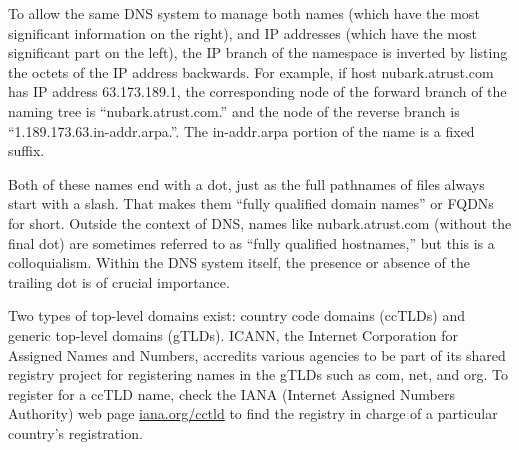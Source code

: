 
\protect\hypertarget{part0024_split_007.htmlux5cux23_idIndexMarker1987}{}{}\protect\hypertarget{part0024_split_007.htmlux5cux23_idIndexMarker1988}{}{}\protect\hypertarget{part0024_split_007.htmlux5cux23_idIndexMarker1989}{}{}\protect\hypertarget{part0024_split_007.htmlux5cux23_idIndexMarker1990}{}{}\protect\hypertarget{part0024_split_007.htmlux5cux23_idIndexMarker1991}{}{}To
allow the same DNS system to manage both names (which have the most
significant information on the right), and IP addresses (which have the
most significant part on the left), the IP branch of the namespace is
inverted by listing the octets of the IP address backwards. For example,
if host nubark.atrust.com has IP address 63.173.189.1, the corresponding
node of the forward branch of the naming tree is ``nubark.atrust.com.''
and the node of the
\protect\hypertarget{part0024_split_007.htmlux5cux23_idIndexMarker1992}{}{}reverse
branch is
``1.189.173.63.\protect\hypertarget{part0024_split_007.htmlux5cux23_idIndexMarker1993}{}{}\protect\hypertarget{part0024_split_007.htmlux5cux23_idIndexMarker1994}{}{}in-addr.arpa.''.
The in-addr.arpa portion of the name is a fixed suffix.

\protect\hypertarget{part0024_split_007.htmlux5cux23_idIndexMarker1995}{}{}\protect\hypertarget{part0024_split_007.htmlux5cux23_idIndexMarker1996}{}{}\protect\hypertarget{part0024_split_007.htmlux5cux23_idIndexMarker1997}{}{}Both
of these names end with a dot, just as the full pathnames of files
always start with a slash. That makes them ``fully qualified domain
names'' or FQDNs for short. Outside the context of DNS, names like
nubark.atrust.com (without the final dot) are sometimes referred to as
``fully qualified hostnames,'' but this is a {colloquialism}. Within the
DNS system itself, the presence or absence of the trailing dot is of
crucial importance.

\protect\hypertarget{part0024_split_007.htmlux5cux23_idIndexMarker1998}{}{}Two
types of top-level domains exist:
\protect\hypertarget{part0024_split_007.htmlux5cux23_idIndexMarker1999}{}{}\protect\hypertarget{part0024_split_007.htmlux5cux23_idIndexMarker2000}{}{}country
code domains (ccTLDs) and
\protect\hypertarget{part0024_split_007.htmlux5cux23_idIndexMarker2001}{}{}\protect\hypertarget{part0024_split_007.htmlux5cux23_idIndexMarker2002}{}{}generic
top-level domains (gTLDs).
\protect\hypertarget{part0024_split_007.htmlux5cux23_idIndexMarker2003}{}{}ICANN,
the
\protect\hypertarget{part0024_split_007.htmlux5cux23_idIndexMarker2004}{}{}Internet
Corporation for Assigned Names and Numbers, accredits various agencies
to be part of its shared registry project for registering names in the
gTLDs such as com, net, and org. To register for a ccTLD name, check the
\protect\hypertarget{part0024_split_007.htmlux5cux23_idIndexMarker2005}{}{}IANA
(\protect\hypertarget{part0024_split_007.htmlux5cux23_idIndexMarker2006}{}{}Internet
Assigned Numbers Authority) web page
{\href{http://iana.org/cctld}{iana.org/cctld}} to find the registry in
charge of a particular country's registration.

